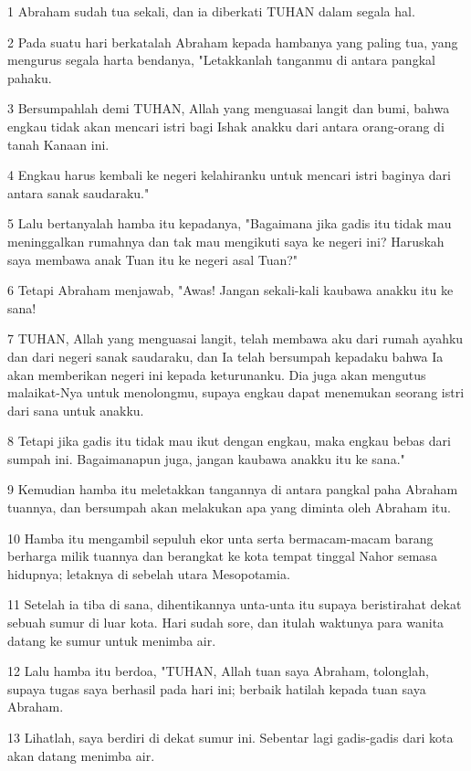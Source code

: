 \par 1 Abraham sudah tua sekali, dan ia diberkati TUHAN dalam segala hal.
\par 2 Pada suatu hari berkatalah Abraham kepada hambanya yang paling tua, yang mengurus segala harta bendanya, "Letakkanlah tanganmu di antara pangkal pahaku.
\par 3 Bersumpahlah demi TUHAN, Allah yang menguasai langit dan bumi, bahwa engkau tidak akan mencari istri bagi Ishak anakku dari antara orang-orang di tanah Kanaan ini.
\par 4 Engkau harus kembali ke negeri kelahiranku untuk mencari istri baginya dari antara sanak saudaraku."
\par 5 Lalu bertanyalah hamba itu kepadanya, "Bagaimana jika gadis itu tidak mau meninggalkan rumahnya dan tak mau mengikuti saya ke negeri ini? Haruskah saya membawa anak Tuan itu ke negeri asal Tuan?"
\par 6 Tetapi Abraham menjawab, "Awas! Jangan sekali-kali kaubawa anakku itu ke sana!
\par 7 TUHAN, Allah yang menguasai langit, telah membawa aku dari rumah ayahku dan dari negeri sanak saudaraku, dan Ia telah bersumpah kepadaku bahwa Ia akan memberikan negeri ini kepada keturunanku. Dia juga akan mengutus malaikat-Nya untuk menolongmu, supaya engkau dapat menemukan seorang istri dari sana untuk anakku.
\par 8 Tetapi jika gadis itu tidak mau ikut dengan engkau, maka engkau bebas dari sumpah ini. Bagaimanapun juga, jangan kaubawa anakku itu ke sana."
\par 9 Kemudian hamba itu meletakkan tangannya di antara pangkal paha Abraham tuannya, dan bersumpah akan melakukan apa yang diminta oleh Abraham itu.
\par 10 Hamba itu mengambil sepuluh ekor unta serta bermacam-macam barang berharga milik tuannya dan berangkat ke kota tempat tinggal Nahor semasa hidupnya; letaknya di sebelah utara Mesopotamia.
\par 11 Setelah ia tiba di sana, dihentikannya unta-unta itu supaya beristirahat dekat sebuah sumur di luar kota. Hari sudah sore, dan itulah waktunya para wanita datang ke sumur untuk menimba air.
\par 12 Lalu hamba itu berdoa, "TUHAN, Allah tuan saya Abraham, tolonglah, supaya tugas saya berhasil pada hari ini; berbaik hatilah kepada tuan saya Abraham.
\par 13 Lihatlah, saya berdiri di dekat sumur ini. Sebentar lagi gadis-gadis dari kota akan datang menimba air.
